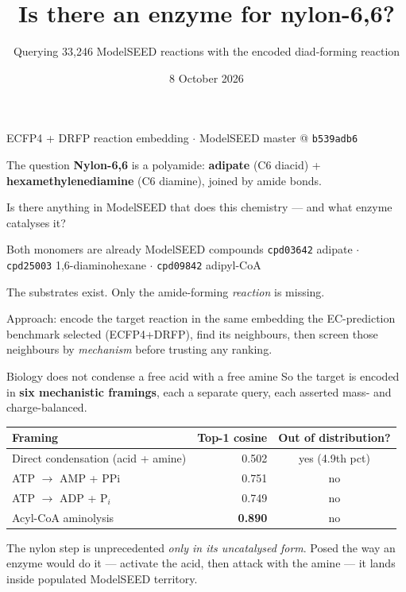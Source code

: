 \documentclass[aspectratio=169,10pt]{beamer}
\title{\textbf{Is there an enzyme for nylon-6,6?}}
\subtitle{Querying 33{,}246 ModelSEED reactions with the encoded diad-forming reaction}
\date{8 October 2026}
\newcommand{\good}[1]{{\color{cGood}\textbf{#1}}}
\newcommand{\bad}[1]{{\color{cBad}#1}}
\newcommand{\takeaway}[1]{\vfill\begin{tcolorbox}[colback=structure!12!white,
  colframe=structure!60!black,boxrule=0.4pt,left=5pt,right=5pt,top=3pt,bottom=3pt]
  \small #1\end{tcolorbox}}
\begin{document}
\begin{frame}[plain]
  \titlepage
  \begin{center}\small ECFP4 + DRFP reaction embedding $\cdot$ ModelSEED master @ \texttt{b539adb6}\end{center}
\end{frame}

\begin{frame}{The question}
  \textbf{Nylon-6,6} is a polyamide: \textbf{adipate} (C6 diacid) +
  \textbf{hexamethylenediamine} (C6 diamine), joined by amide bonds.

  \medskip
  Is there anything in ModelSEED that does this chemistry --- and what enzyme
  catalyses it?

  \medskip
  \begin{block}{Both monomers are already ModelSEED compounds}
    \texttt{cpd03642} adipate \quad $\cdot$ \quad \texttt{cpd25003}
    1,6-diaminohexane \quad $\cdot$ \quad \texttt{cpd09842} adipyl-CoA
    \smallskip

    The substrates exist. Only the amide-forming \emph{reaction} is missing.
  \end{block}

  \takeaway{Approach: encode the target reaction in the same embedding the
  EC-prediction benchmark selected (ECFP4+DRFP), find its neighbours, then screen
  those neighbours by \emph{mechanism} before trusting any ranking.}
\end{frame}

\begin{frame}{Biology does not condense a free acid with a free amine}
  So the target is encoded in \textbf{six mechanistic framings}, each a separate
  query, each asserted mass- and charge-balanced.

  \medskip
  \centering
  \begin{tabular}{lrc}
    \toprule
    \textbf{Framing} & \textbf{Top-1 cosine} & \textbf{Out of distribution?} \\
    \midrule
    Direct condensation (acid + amine) & 0.502 & \bad{yes} (4.9th pct) \\
    ATP $\rightarrow$ AMP + PPi        & 0.751 & no \\
    ATP $\rightarrow$ ADP + P$_i$      & 0.749 & no \\
    Acyl-CoA aminolysis                & \good{0.890} & no \\
    \bottomrule
  \end{tabular}

  \takeaway{The nylon step is unprecedented \emph{only in its uncatalysed form}.
  Posed the way an enzyme would do it --- activate the acid, then attack with the
  amine --- it lands inside populated ModelSEED territory.}
\end{frame}
\end{document}
